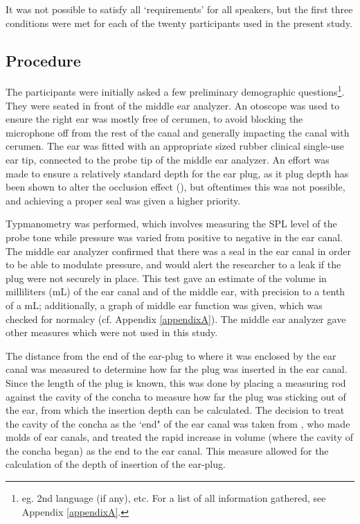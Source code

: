 It was not possible to satisfy all `requirements' for all speakers, but the first three conditions were met for each of the twenty participants used in the present study.

\subsection{Procedure}\label{chap2:methods:procedure}

The participants were initially asked a few preliminary demographic questions\footnote{eg. 2nd language (if any), etc. For a list of all information gathered, see Appendix \ref{appendixA}.}. They were seated in front of the middle ear analyzer.  An otoscope was used to ensure the right ear was mostly free of cerumen, to avoid blocking the microphone off from the rest of the canal and generally impacting the canal with cerumen.  The ear was fitted with an appropriate sized rubber clinical single-use ear tip, connected to the probe tip of the middle ear analyzer.  An effort was made to ensure a relatively standard depth for the ear plug, as it plug depth has been shown to alter the occlusion effect (\cite{dean:00,stenfelt:07}), but oftentimes this was not possible, and achieving a proper seal was given a higher priority.

Typmanometry was performed, which involves measuring the SPL level of the probe tone while pressure was varied from positive to negative in the ear canal.  The middle ear analyzer confirmed that there was a seal in the ear canal in order to be able to modulate pressure, and would alert the researcher to a leak if the plug were not securely in place.  This test gave an estimate of the volume in milliliters (mL) of the ear canal and of the middle ear, with precision to a tenth of a mL; additionally, a graph of middle ear function was given, which was checked for normalcy (cf. Appendix \ref{appendixA}).  The middle ear analyzer gave other measures which were not used in this study.

The distance from the end of the ear-plug to where it was enclosed by the ear canal was measured to determine how far the plug was inserted in the ear canal.
Since the length of the plug is known, this was done by placing a measuring rod against the cavity of the concha to measure how far the plug was sticking out of the ear, from which the insertion depth can be calculated. The decision to treat the cavity of the concha as the `end" of the ear canal was taken from \cite{stenfelt:07}, who made molds of ear canals, and treated the rapid increase in volume (where the cavity of the concha began) as the end to the ear canal.  This measure allowed for the calculation of the depth of insertion of the ear-plug.



